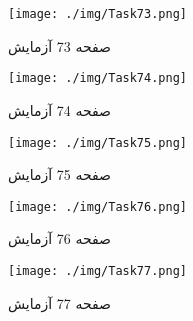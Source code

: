 { 
\begin{figure}[htpb]
\centering
\texttt{[image: ./img/Task73.png]}
\caption{ صفحه 73 آزمایش }
\label{fig:Task73}
\end{figure}
 
 
\begin{figure}[htpb]
\centering
\texttt{[image: ./img/Task74.png]}
\caption{ صفحه 74 آزمایش }
\label{fig:Task74}
\end{figure}
 
 
\begin{figure}[htpb]
\centering
\texttt{[image: ./img/Task75.png]}
\caption{ صفحه 75 آزمایش }
\label{fig:Task75}
\end{figure}
 
 
\begin{figure}[htpb]
\centering
\texttt{[image: ./img/Task76.png]}
\caption{ صفحه 76 آزمایش }
\label{fig:Task76}
\end{figure}
 
 
\begin{figure}[htpb]
\centering
\texttt{[image: ./img/Task77.png]}
\caption{ صفحه 77 آزمایش }
\label{fig:Task77}
\end{figure}
 
 
}
